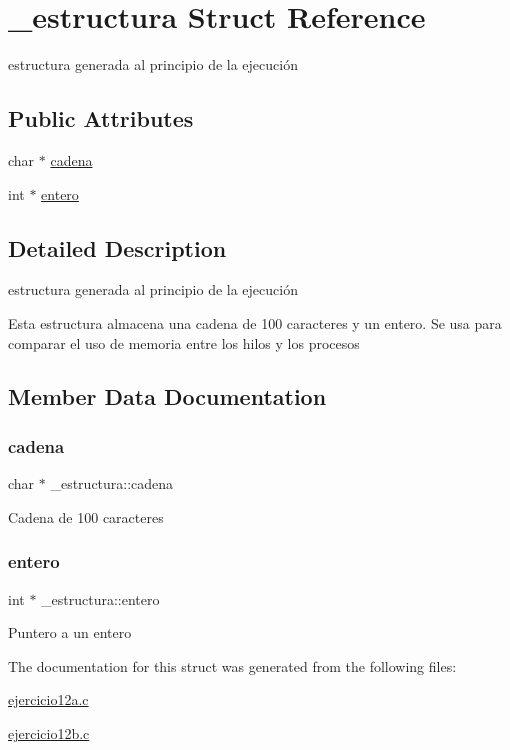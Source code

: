 \hypertarget{struct__estructura}{}\section{\+\_\+estructura Struct Reference}
\label{struct__estructura}


estructura generada al principio de la ejecución  


\subsection*{Public Attributes}
\begin{DoxyCompactItemize}
\item 
char $\ast$ \mbox{\hyperlink{struct__estructura_a29bf54eee61a6cc3369758a5ee0cd1fa}{cadena}}
\item 
int $\ast$ \mbox{\hyperlink{struct__estructura_a7fefe0e76b29d4f973ce0a45c7fed838}{entero}}
\end{DoxyCompactItemize}


\subsection{Detailed Description}
estructura generada al principio de la ejecución 

Esta estructura almacena una cadena de 100 caracteres y un entero. Se usa para comparar el uso de memoria entre los hilos y los procesos 

\subsection{Member Data Documentation}
\mbox{\label{struct__estructura_a29bf54eee61a6cc3369758a5ee0cd1fa}} 
\subsubsection{\texorpdfstring{cadena}{cadena}}
{\footnotesize\ttfamily char $\ast$ \+\_\+estructura\+::cadena}

Cadena de 100 caracteres \mbox{\label{struct__estructura_a7fefe0e76b29d4f973ce0a45c7fed838}} 
\subsubsection{\texorpdfstring{entero}{entero}}
{\footnotesize\ttfamily int $\ast$ \+\_\+estructura\+::entero}

Puntero a un entero 

The documentation for this struct was generated from the following files\+:\begin{DoxyCompactItemize}
\item 
\mbox{\hyperlink{ejercicio12a_8c}{ejercicio12a.\+c}}\item 
\mbox{\hyperlink{ejercicio12b_8c}{ejercicio12b.\+c}}\end{DoxyCompactItemize}
